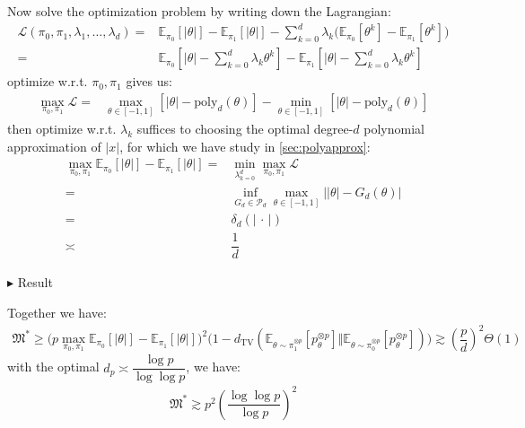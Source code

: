 \documentclass[11pt,a4paper]{article}
\numberwithin{equation}{section}%
\newenvironment{point}{\raggedright$\blacktriangleright$}{}
\begin{document}
Now solve the optimization problem by writing down the Lagrangian:
\begin{align*}
    \mathcal{L}(\pi_0,\pi_1, \lambda _1,\ldots,\lambda _d) =& \mathbb{E}_{ \pi_0 }\left[ \left\vert \theta  \right\vert  \right] -\mathbb{E}_{ \pi_1 }\left[ \left\vert \theta  \right\vert  \right] -\sum_{k=0}^d\lambda _k\big( \mathbb{E}_{ \pi_0 }\left[ \theta ^k \right] -\mathbb{E}_{ \pi_1 }\left[ \theta ^k \right]  \big)\\
    =& \mathbb{E}_{ \pi_0 }\left[ \left\vert \theta  \right\vert  -\sum_{k=0}^d\lambda _k\theta ^k  \right] -\mathbb{E}_{ \pi_1 }\left[ \left\vert \theta  \right\vert  -\sum_{k=0}^d\lambda _k\theta ^k  \right]
\end{align*}
optimize w.r.t. $ \pi_0,\pi_1 $ gives us:
\begin{align*}
     \mathop{ \max }\limits_{ \pi_0,\pi_1}\mathcal{L}=& \mathop{ \max  }\limits_{\theta \in [-1,1] }[\left\vert \theta  \right\vert - \mathrm{ poly }_d(\theta )] - \mathop{ \min }\limits_{\theta \in [-1,1]}[\left\vert \theta  \right\vert - \mathrm{ poly }_d(\theta )]
\end{align*}
then optimize w.r.t. $ \lambda _k $ suffices to choosing the optimal degree-$ d $ polynomial approximation of $ \left\vert x \right\vert  $, for which we have study in \autoref{sec:polyapprox}:
\begin{align*}
    \mathop{ \max }\limits_{\pi_0,\pi_1} \mathbb{E}_{ \pi_0 }\left[ \left\vert \theta  \right\vert  \right] -\mathbb{E}_{ \pi_1 }\left[ \left\vert \theta  \right\vert  \right]=&\min_{\lambda _{k=0}^d}\mathop{ \max }\limits_{ \pi_0,\pi_1}\mathcal{L} \\
    =& \mathop{ \inf }\limits_{G_d\in \mathcal{P}_d} \mathop{ \max }\limits_{\theta \in [-1,1]} \big\vert \left\vert \theta  \right\vert - G_d(\theta ) \big\vert \\
    =&\delta _d(\left\vert \, \cdot \,  \right\vert ) \\
    \asymp& \dfrac{ 1 }{ d }
\end{align*}


\begin{point}
    Result
\end{point}

Together we have:
\begin{align*}
    \mathfrak{M}^* \geq \big( p\mathop{ \max }\limits_{\pi_0,\pi_1} \mathbb{E}_{ \pi_0 }\left[ \left\vert \theta  \right\vert  \right] -\mathbb{E}_{ \pi_1 }\left[ \left\vert \theta  \right\vert  \right] \big)^2\big(1- d_\mathrm{ TV }\left(\mathbb{E}_{ \theta \sim \pi_1^{\otimes p} }\left[ p_\theta ^{\otimes p} \right] \big\Vert \mathbb{E}_{ \theta \sim \pi_0^{\otimes p} }\left[ p_\theta ^{\otimes p} \right] \right)  \big)
    \gtrsim (\dfrac{ p }{ d } )^2\Theta (1) 
\end{align*}
with the optimal $ d_p\asymp \dfrac{ \log p }{ \log\log p } $, we have:
\begin{align*}
    \mathfrak{M}^* \gtrsim p^2\left( \dfrac{ \log\log p }{ \log p } \right) ^2
\end{align*}
\end{document}

